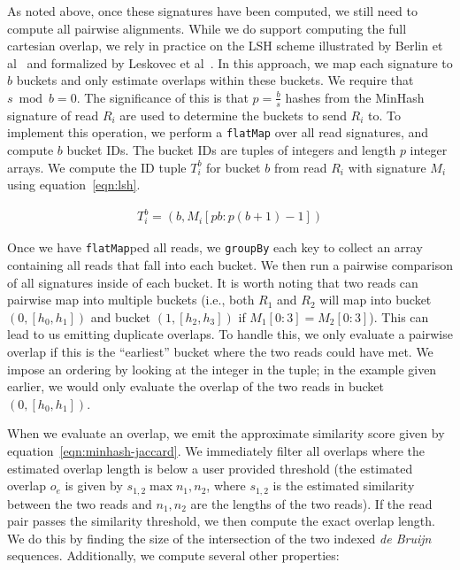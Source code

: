 \documentclass[11pt]{article}
\theoremstyle{plain}
\begin{document}
As noted above, once these signatures have been computed, we still need to compute all pairwise
alignments. While we do support computing the full cartesian overlap, we rely in practice on
the LSH scheme illustrated by Berlin et al~\cite{berlin14} and formalized by Leskovec et
al~\cite{leskovec14}. In this approach, we map each signature to $b$ buckets and only estimate
overlaps within these buckets. We require that $s \bmod b = 0$. The significance of this is
that $p = \frac{b}{s}$ hashes from the MinHash signature of read $R_i$ are used to determine
the buckets to send $R_i$ to. To implement this operation, we perform a \texttt{flatMap} over
all read signatures, and compute $b$ bucket IDs. The bucket IDs are tuples of integers and
length $p$ integer arrays. We compute the ID tuple $T_i^b$ for bucket $b$ from read $R_i$ with
signature $M_i$ using equation~\eqref{eqn:lsh}.

\begin{align}
\label{eqn:lsh}
T_i^b = (b, M_i[p b:p (b + 1) - 1])
\end{align}

Once we have \texttt{flatMap}ped all reads, we \texttt{groupBy} each key to collect an array
containing all reads that fall into each bucket. We then run a pairwise comparison of all
signatures inside of each bucket. It is worth noting that two reads can pairwise map into
multiple buckets (i.e., both $R_1$ and $R_2$ will map into bucket $(0, [h_0, h_1])$ and bucket
$(1, [h_2, h_3])$ if $M_1[0:3] = M_2[0:3]$). This can lead to us emitting duplicate overlaps.
To handle this, we only evaluate a pairwise overlap if this is the ``earliest'' bucket where
the two reads could have met. We impose an ordering by looking at the integer in the tuple; in
the example given earlier, we would only evaluate the overlap of the two reads in bucket $(0,
[h_0, h_1])$.

When we evaluate an overlap, we emit the approximate similarity score given by
equation~\eqref{eqn:minhash-jaccard}. We immediately filter all overlaps where the
estimated overlap length is below a user provided threshold (the estimated overlap $o_e$
is given by $s_{1,2} \max n_1, n_2$, where $s_{1,2}$ is the estimated similarity between
the two reads and $n_1, n_2$ are the lengths of the two reads). If the read pair passes the
similarity threshold, we then compute the exact overlap length. We do this by finding the
size of the intersection of the two indexed \emph{de Bruijn} sequences. Additionally, we
compute several other properties:
\end{document}
